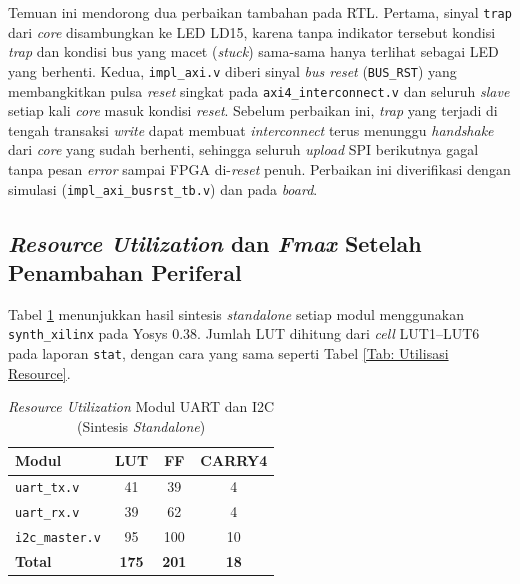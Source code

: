 Temuan ini mendorong dua perbaikan tambahan pada RTL. Pertama, sinyal \texttt{trap} dari \textit{core} disambungkan ke LED LD15, karena tanpa indikator tersebut kondisi \textit{trap} dan kondisi bus yang macet (\textit{stuck}) sama-sama hanya terlihat sebagai LED yang berhenti. Kedua, \texttt{impl\_axi.v} diberi sinyal \textit{bus reset} (\texttt{BUS\_RST}) yang membangkitkan pulsa \textit{reset} singkat pada \texttt{axi4\_interconnect.v} dan seluruh \textit{slave} setiap kali \textit{core} masuk kondisi \textit{reset}. Sebelum perbaikan ini, \textit{trap} yang terjadi di tengah transaksi \textit{write} dapat membuat \textit{interconnect} terus menunggu \textit{handshake} dari \textit{core} yang sudah berhenti, sehingga seluruh \textit{upload} SPI berikutnya gagal tanpa pesan \textit{error} sampai FPGA di-\textit{reset} penuh. Perbaikan ini diverifikasi dengan simulasi (\texttt{impl\_axi\_busrst\_tb.v}) dan pada \textit{board}.

\subsection{\textit{Resource Utilization} dan \textit{Fmax} Setelah Penambahan Periferal}
\label{subsec:resource-uart-i2c}

Tabel \ref{Tab: Resource Modul UART I2C} menunjukkan hasil sintesis \textit{standalone} setiap modul menggunakan \texttt{synth\_xilinx} pada Yosys 0.38. Jumlah LUT dihitung dari \textit{cell} LUT1--LUT6 pada laporan \texttt{stat}, dengan cara yang sama seperti Tabel \ref{Tab: Utilisasi Resource}.

\begin{table}[H]
	\centering
	\begin{tabular}{|l|c|c|c|}
		\hline
		\textbf{Modul} & \textbf{LUT} & \textbf{FF} & \textbf{CARRY4} \\
		\hline
		\texttt{uart\_tx.v} & 41 & 39 & 4 \\ \hline
		\texttt{uart\_rx.v} & 39 & 62 & 4 \\ \hline
		\texttt{i2c\_master.v} & 95 & 100 & 10 \\ \hline
		\textbf{Total} & \textbf{175} & \textbf{201} & \textbf{18} \\ \hline
	\end{tabular}
	\vspace{0.5em}
	\caption{\textit{Resource Utilization} Modul UART dan I2C (Sintesis \textit{Standalone})}
	\label{Tab: Resource Modul UART I2C}
\end{table}

